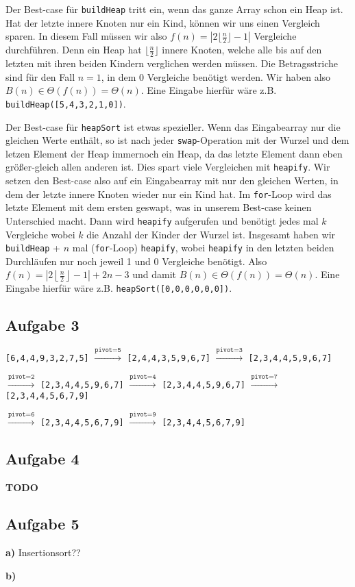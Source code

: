 \documentclass[a4paper,graphics,11pt]{article}
\newcommand{\aufgabe}[1]{\subsection*{Aufgabe #1}}
\begin{document}
Der Best-case für \texttt{buildHeap} tritt ein, wenn das ganze Array schon ein Heap ist.
Hat der letzte innere Knoten nur ein Kind, können wir uns einen Vergleich sparen. In diesem Fall müssen wir also
$f(n) = |2\lfloor \frac{n}{2} \rfloor-1|$ Vergleiche durchführen. Denn ein Heap hat $\lfloor \frac{n}{2} \rfloor$ innere
Knoten, welche alle bis auf den letzten mit ihren beiden Kindern verglichen werden müssen.
Die Betragsstriche sind für den Fall $n=1$, in dem 0 Vergleiche benötigt werden.
Wir haben also $B(n) \in \Theta(f(n)) = \Theta(n)$.
Eine Eingabe hierfür wäre z.B. \texttt{buildHeap([5,4,3,2,1,0])}.

Der Best-case für \texttt{heapSort} ist etwas spezieller. Wenn das Eingabearray nur die gleichen Werte enthält, so
ist nach jeder \texttt{swap}-Operation mit der Wurzel und dem letzen Element der Heap immernoch ein Heap, da das letzte
Element dann eben größer-gleich allen anderen ist.
Dies spart viele Vergleichen mit \texttt{heapify}.
Wir setzen den Best-case also auf ein Eingabearray mit nur den gleichen Werten,
in dem der letzte innere Knoten wieder nur ein Kind hat.
Im \texttt{for}-Loop wird das letzte Element mit dem ersten geswapt, was in unserem Best-case keinen Unterschied macht.
Dann wird \texttt{heapify} aufgerufen und benötigt jedes mal $k$ Vergleiche wobei $k$ die Anzahl der Kinder der Wurzel ist.
Insgesamt haben wir \texttt{buildHeap} + $n$ mal (\texttt{for}-Loop) \texttt{heapify},
wobei \texttt{heapify} in den letzten beiden Durchläufen nur noch jeweil 1 und 0 Vergleiche
benötigt. Also $ f(n) = \left|2\left\lfloor \frac{n}{2} \right\rfloor -1\right| + 2n - 3$
und damit $B(n) \in \Theta(f(n)) = \Theta(n)$.
Eine Eingabe hierfür wäre z.B. \texttt{heapSort([0,0,0,0,0,0])}.



\aufgabe{3}
\texttt{[6,4,4,9,3,2,7,5]} $\xrightarrow{\texttt{pivot=5}}$
\texttt{[2,4,4,3,5,9,6,7]} $\xrightarrow{\texttt{pivot=3}}$
\texttt{[2,3,4,4,5,9,6,7]}

$\xrightarrow{\texttt{pivot=2}}$ \texttt{[2,3,4,4,5,9,6,7]}
$\xrightarrow{\texttt{pivot=4}}$ \texttt{[2,3,4,4,5,9,6,7]}
$\xrightarrow{\texttt{pivot=7}}$ \texttt{[2,3,4,4,5,6,7,9]}

$\xrightarrow{\texttt{pivot=6}}$ \texttt{[2,3,4,4,5,6,7,9]}
$\xrightarrow{\texttt{pivot=9}}$ \texttt{[2,3,4,4,5,6,7,9]}

\aufgabe{4}
\textbf{TODO}
\newpage

\aufgabe{5}
\textbf{a)}
Insertionsort??

\textbf{b)}
\end{document}

